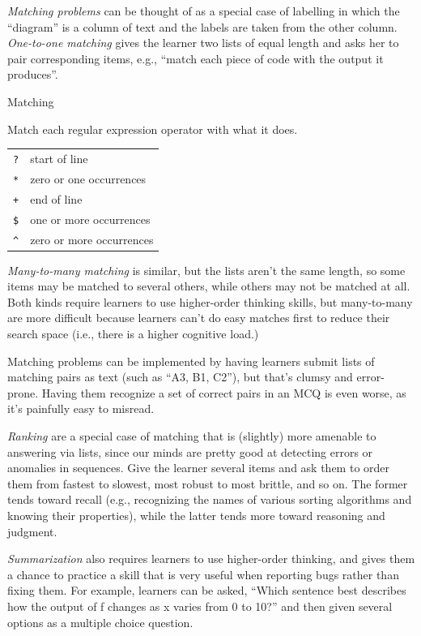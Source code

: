 \emph{Matching problems} can be thought of as a special case of
labelling in which the ``diagram'' is a column of text and the labels
are taken from the other column.  \emph{One-to-one matching} gives the
learner two lists of equal length and asks her to pair corresponding
items, e.g., ``match each piece of code with the output it produces''.

\begin{callout}{Matching}

  Match each regular expression operator with what it does.

  \begin{tabular}{ll}
    \texttt{?} & start of line \\
    \texttt{*} & zero or one occurrences \\
    \texttt{+} & end of line \\
    \texttt{\$} & one or more occurrences \\
    \texttt{\textasciicircum} & zero or more occurrences \\
  \end{tabular}

\end{callout}

\emph{Many-to-many matching} is similar, but the lists aren't the same
length, so some items may be matched to several others, while others
may not be matched at all. Both kinds require learners to use
higher-order thinking skills, but many-to-many are more difficult
because learners can't do easy matches first to reduce their search
space (i.e., there is a higher cognitive load.)

Matching problems can be implemented by having learners submit lists
of matching pairs as text (such as ``A3, B1, C2''), but that's clumsy
and error-prone.  Having them recognize a set of correct pairs in an
MCQ is even worse, as it's painfully easy to misread.

\emph{Ranking} are a special case of matching that is (slightly) more
amenable to answering via lists, since our minds are pretty good at
detecting errors or anomalies in sequences.  Give the learner several
items and ask them to order them from fastest to slowest, most robust
to most brittle, and so on.  The former tends toward recall (e.g.,
recognizing the names of various sorting algorithms and knowing their
properties), while the latter tends more toward reasoning and
judgment.

\emph{Summarization} also requires learners to use higher-order
thinking, and gives them a chance to practice a skill that is very
useful when reporting bugs rather than fixing them. For example,
learners can be asked, ``Which sentence best describes how the output
of f changes as x varies from 0 to 10?'' and then given several
options as a multiple choice question.

